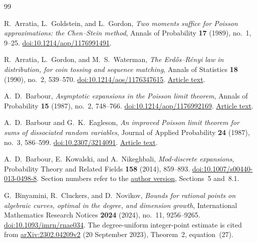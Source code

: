 \begin{thebibliography}{99}

R.~Arratia, L.~Goldstein, and L.~Gordon,
\emph{Two moments suffice for Poisson approximations:
the Chen--Stein method},
Annals of Probability \textbf{17} (1989), no.~1, 9--25.
\href{https://doi.org/10.1214/aop/1176991491}
{doi:10.1214/aop/1176991491}.

R.~Arratia, L.~Gordon, and M.~S.~Waterman,
\emph{The Erd\H{o}s--R\'enyi law in distribution, for coin tossing
and sequence matching},
Annals of Statistics \textbf{18} (1990), no.~2, 539--570.
\href{https://doi.org/10.1214/aos/1176347615}
{doi:10.1214/aos/1176347615}.
\href{https://dornsife.usc.edu/msw/wp-content/uploads/sites/236/2023/09/msw-093.pdf}
{Article text}.

A.~D.~Barbour,
\emph{Asymptotic expansions in the Poisson limit theorem},
Annals of Probability \textbf{15} (1987), no.~2, 748--766.
\href{https://doi.org/10.1214/aop/1176992169}
{doi:10.1214/aop/1176992169}.
\href{https://user.math.uzh.ch/barbour/pub/Barbour/AsympExpanPois.pdf}
{Article text}.

A.~D.~Barbour and G.~K.~Eagleson,
\emph{An improved Poisson limit theorem for sums of dissociated
random variables},
Journal of Applied Probability \textbf{24} (1987), no.~3, 586--599.
\href{https://doi.org/10.2307/3214091}
{doi:10.2307/3214091}.
\href{https://user.math.uzh.ch/barbour/pub/Barbour/BEagleson_ImprovedPoisson.pdf}
{Article text}.

A.~D.~Barbour, E.~Kowalski, and A.~Nikeghbali,
\emph{Mod-discrete expansions},
Probability Theory and Related Fields \textbf{158}
(2014), 859--893.
\href{https://doi.org/10.1007/s00440-013-0498-8}
{doi:10.1007/s00440-013-0498-8}.
Section numbers refer to the
\href{https://people.math.ethz.ch/~kowalski/mod-discrete.pdf}
{author version}, Sections~5 and~8.1.

G.~Binyamini, R.~Cluckers, and D.~Novikov,
\emph{Bounds for rational points on algebraic curves, optimal
in the degree, and dimension growth},
International Mathematics Research Notices \textbf{2024} (2024),
no.~11, 9256--9265.
\href{https://doi.org/10.1093/imrn/rnae034}
{doi:10.1093/imrn/rnae034}.
The degree-uniform integer-point estimate is cited from
\href{https://arxiv.org/abs/2302.04209v2}
{arXiv:2302.04209v2} (20 September 2023),
Theorem~2, equation~(27).


\end{thebibliography}
